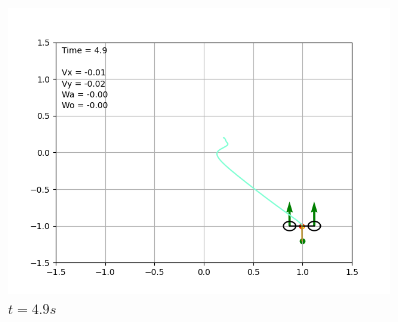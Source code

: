 \begin{figure}[H]
\centering
\includegraphics[width=0.9\textwidth]{pictures/ani49.png}
\caption{$t = 4.9s$}
\label{fig:ani49}
\end{figure}